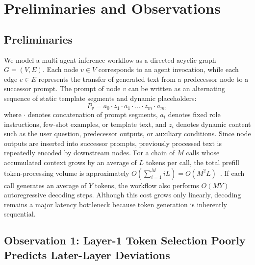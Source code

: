 \documentclass[letterpaper]{article} %
\begin{document}
\section{Preliminaries and Observations}

\subsection{Preliminaries}

We model a multi-agent inference workflow as a directed acyclic graph $G=(V,E)$. Each node $v\in V$ corresponds to an agent invocation, while each edge $e\in E$ represents the transfer of generated text from a predecessor node to a successor prompt. The prompt of node $v$ can be written as an alternating sequence of static template segments and dynamic placeholders:
\begin{equation}
	P_v = a_0 \cdot z_1 \cdot a_1 \cdot \ldots \cdot z_m \cdot a_m,
	\label{eq:prompt-decomposition}
\end{equation}
where $\cdot$ denotes concatenation of prompt segments, $a_i$ denotes  fixed role instructions, few-shot examples, or template text, and $z_i$ denotes dynamic content such as the user question, predecessor outputs, or auxiliary conditions. Since node outputs are inserted into successor prompts, previously processed text is repeatedly encoded by downstream nodes. For a chain of $M$ calls whose accumulated context grows by an average of $L$ tokens per call, the total prefill token-processing volume is approximately $O(\sum_{i=1}^{M}iL)=O(M^2L)$~\citep{DBLP:journals/corr/abs-2510-12872}. If each call generates an average of $Y$ tokens, the workflow also performs $O(MY)$ autoregressive decoding steps. Although this cost grows only linearly, decoding remains a major latency bottleneck because token generation is inherently sequential.

\subsection{Observation 1: Layer-1 Token Selection Poorly Predicts Later-Layer Deviations}
\end{document}
